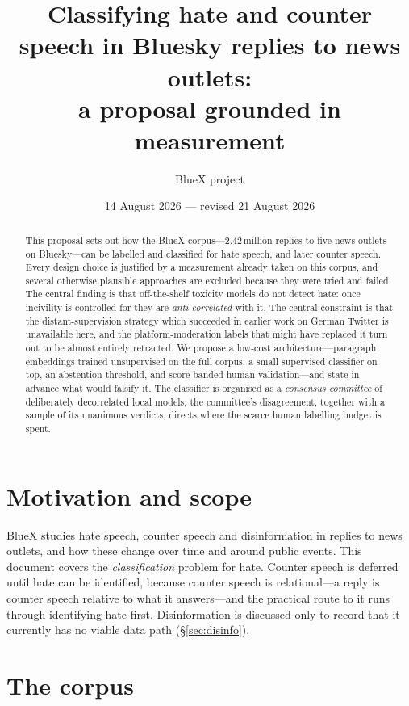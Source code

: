 \documentclass[11pt,a4paper]{article}
\title{Classifying hate and counter speech in Bluesky replies to news outlets:\\
       a proposal grounded in measurement}
\author{BlueX project}
\date{14 August 2026 --- revised 21 August 2026}
\begin{document}
\maketitle

\begin{abstract}
\noindent
This proposal sets out how the BlueX corpus---2.42\,million replies to five news
outlets on Bluesky---can be labelled and classified for hate speech, and later
counter speech. Every design choice is justified by a measurement already taken on
this corpus, and several otherwise plausible approaches are excluded because they
were tried and failed. The central finding is that off-the-shelf toxicity models do
not detect hate: once incivility is controlled for they are \emph{anti-correlated}
with it. The central constraint is that the distant-supervision strategy which
succeeded in earlier work on German Twitter is unavailable here, and the
platform-moderation labels that might have replaced it turn out to be almost
entirely retracted. We propose a low-cost architecture---paragraph embeddings
trained unsupervised on the full corpus, a small supervised classifier on top, an
abstention threshold, and score-banded human validation---and state in advance what
would falsify it. The classifier is organised as a \emph{consensus committee} of
deliberately decorrelated local models; the committee's disagreement, together with
a sample of its unanimous verdicts, directs where the scarce human labelling budget
is spent.
\end{abstract}

\section{Motivation and scope}

BlueX studies hate speech, counter speech and disinformation in replies to news
outlets, and how these change over time and around public events. This document
covers the \emph{classification} problem for hate. Counter speech is deferred until
hate can be identified, because counter speech is relational---a reply is counter
speech relative to what it answers---and the practical route to it runs through
identifying hate first. Disinformation is discussed only to record that it currently
has no viable data path (\S\ref{sec:disinfo}).

\section{The corpus}
\end{document}
